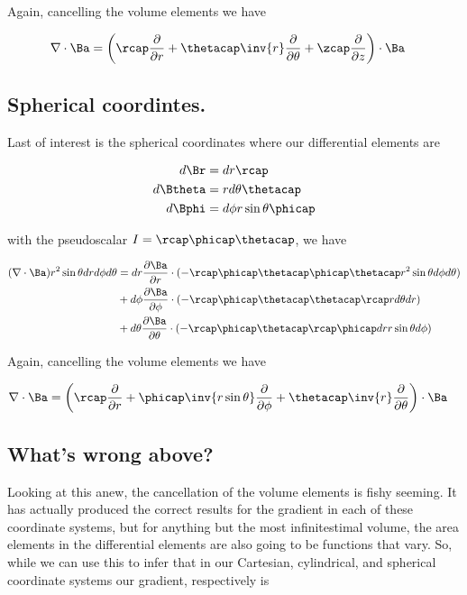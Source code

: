 Again, cancelling the volume elements we have

\begin{align}\label{eqn:foo7}
\grad \cdot \Ba &=
\left(\rcap \PD{r}{}
+\thetacap \inv{r} \PD{\theta}{}
+\zcap \PD{z}{} \right) \cdot \Ba
\end{align}

\subsection{Spherical coordintes.}

Last of interest is the spherical coordinates where our differential elements are

\begin{align*}
d\Br &= dr \rcap \\
d\Btheta &= r d\theta \thetacap \\
d\Bphi &= d\phi r \sin\theta \phicap
\end{align*}

with the pseudoscalar $I = \rcap \phicap \thetacap$, we have

\begin{align*}
(\grad \cdot \Ba ) r^2 \sin\theta dr d\phi d\theta &=
 dr \PD{r}{\Ba} \cdot (-\rcap \phicap \thetacap \phicap \thetacap r^2 \sin\theta d\phi d\theta )  \\
&+d\phi \PD{\phi}{\Ba} \cdot (-\rcap \phicap \thetacap \thetacap \rcap r d\theta dr )  \\
&+d\theta \PD{\theta}{\Ba} \cdot (-\rcap \phicap \thetacap \rcap \phicap dr r \sin\theta d\phi ) 
\end{align*}

Again, cancelling the volume elements we have

\begin{align}\label{eqn:foo8}
\grad \cdot \Ba &=
\left(\rcap \PD{r}{}
+\phicap \inv{r \sin\theta} \PD{\phi}{} 
+\thetacap \inv{r} \PD{\theta}{}
\right) \cdot \Ba
\end{align}

\subsection{What's wrong above?}

Looking at this anew, the cancellation of the volume elements is fishy seeming.  It has actually produced the correct results for the gradient in each of these coordinate systems, but for anything but the most infinitestimal volume, the area elements in the differential elements are also going to be functions that vary.  So, while we can use this to infer that in our Cartesian, cylindrical, and spherical coordinate systems our gradient, respectively is

